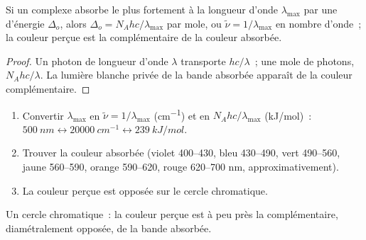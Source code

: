 \begin{proposition}\label{prop:b2:ligand-field:colour}
Si un complexe absorbe le plus fortement à la longueur d'onde $\lambda_{\max}$ par une 
d'énergie $\Delta_o$, alors $\Delta_o = N_Ahc/\lambda_{\max}$ par mole, ou $\tilde\nu = 1/\lambda_{\max}$
en nombre d'onde~; la couleur perçue est la complémentaire de la couleur absorbée.
\end{proposition}

\begin{proof}
Un photon de longueur d'onde $\lambda$ transporte $hc/\lambda$~; une mole de photons, $N_Ahc/\lambda$. La lumière
blanche privée de la bande absorbée apparaît de la couleur complémentaire.
\end{proof}

\begin{method}\label{met:b2:ligand-field:colour}
\begin{enumerate}
  \item Convertir $\lambda_{\max}$ en $\tilde\nu = 1/\lambda_{\max}$ (\unit{cm^{-1}}) et en
        $N_Ahc/\lambda_{\max}$ (\unit{kJ/mol})~: $\qty{500}{nm} \leftrightarrow \qty{20000}{cm^{-1}}
        \leftrightarrow \qty{239}{kJ/mol}$.
  \item Trouver la couleur absorbée (violet 400--430, bleu 430--490, vert 490--560, jaune
        560--590, orange 590--620, rouge 620--700 nm, approximativement).
  \item La couleur perçue est opposée sur le cercle chromatique.
\end{enumerate}
\end{method}

\begin{omfigure}

{\small Un cercle chromatique~: la couleur perçue est à peu près la complémentaire, diamétralement
opposée, de la bande absorbée.}
\end{omfigure}

